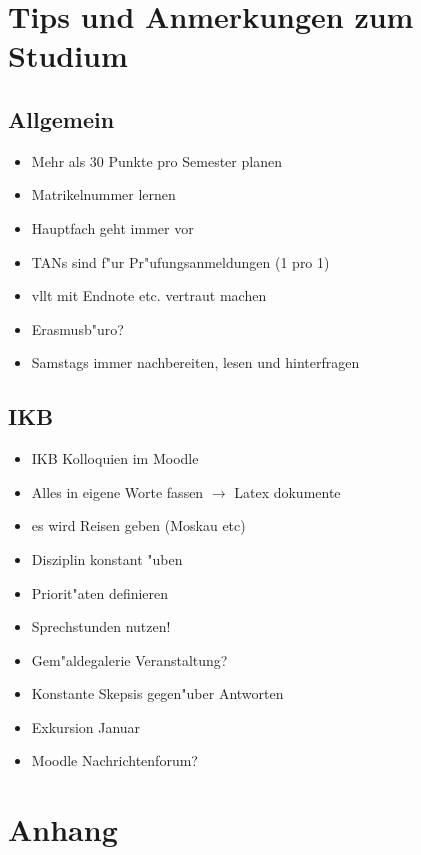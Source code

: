 \documentclass[]{scrartcl}
\begin{document}
\newpage
\section{Tips und Anmerkungen zum Studium}

\subsection{Allgemein}

\begin{itemize}
    \item Mehr als 30 Punkte pro Semester planen
    \item Matrikelnummer lernen
    \item Hauptfach geht immer vor
    \item TANs sind f"ur Pr"ufungsanmeldungen (1 pro 1)
    \item vllt mit Endnote etc. vertraut machen
    \item Erasmusb"uro?
    \item Samstags immer nachbereiten, lesen und hinterfragen
  \end{itemize}
  
\medskip
  
  \subsection{IKB}
  
  \begin{itemize}
    \item IKB Kolloquien im Moodle
    \item Alles in eigene Worte fassen $\rightarrow$ Latex dokumente
    \item es wird Reisen geben (Moskau etc)
    \item Disziplin konstant "uben
    \item Priorit"aten definieren
    \item Sprechstunden nutzen!
    \item Gem"aldegalerie Veranstaltung?
    \item Konstante Skepsis gegen"uber Antworten
    \item Exkursion Januar 
    \item Moodle Nachrichtenforum?
  \end{itemize}
  
\newpage
\section{Anhang}
\end{document}
